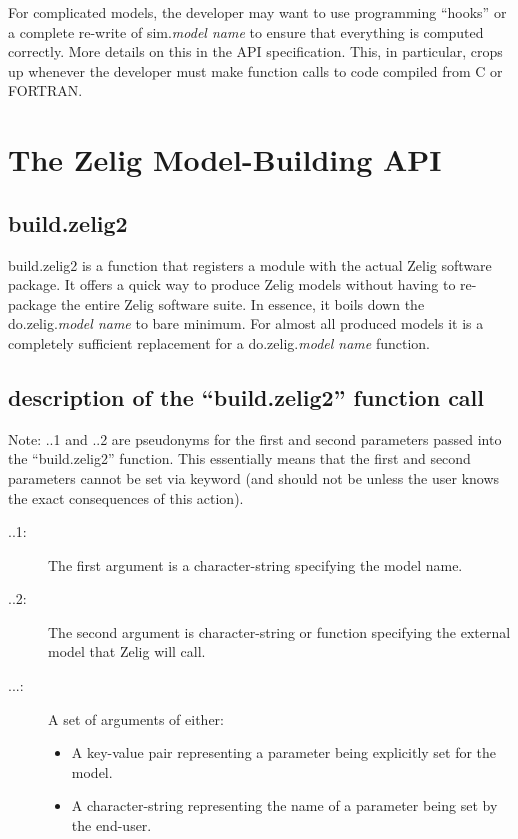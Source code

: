 For complicated models, the developer may want to use programming ``hooks'' or a complete re-write of sim.\emph{model name} to ensure that everything is computed correctly.  More details on this in the API specification.  This, in particular, crops up whenever the developer must make function calls to code compiled from C or FORTRAN.

\section{The Zelig Model-Building API}

\subsection{build.zelig2}
build.zelig2 is a function that registers a module with the actual Zelig software package.  It offers a quick way to produce Zelig models without having to re-package the entire Zelig software suite.  In essence, it boils down the do.zelig.\emph{model name} to bare minimum.  For almost all produced models it is a completely sufficient replacement for a do.zelig.\emph{model name} function.


\subsection{description of the ``build.zelig2'' function call}
Note: ..1 and ..2 are pseudonyms for the first and second parameters passed into the ``build.zelig2'' function.  This essentially means that the first and second parameters cannot be set via keyword (and should not be unless the user knows the exact consequences of this action).


\begin{description}
	\item[..1:]{The first argument is a character-string specifying the model name.}
	\item[..2:]{The second argument is character-string or function specifying the external model that Zelig will call.}
	\item[...:]{A set of arguments of either: 
		\begin{itemize}
			\item{A key-value pair representing a parameter being explicitly set for the model.}
			\item{A character-string representing the name of a parameter being set by the end-user.}
		\end{itemize}
	}
\end{description}


